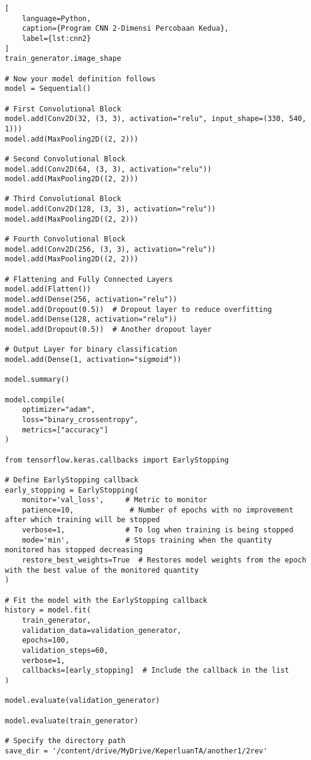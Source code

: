 \begin{lstlisting}[
    language=Python,
    caption={Program CNN 2-Dimensi Percobaan Kedua},
    label={lst:cnn2}
]
train_generator.image_shape

# Now your model definition follows
model = Sequential()

# First Convolutional Block
model.add(Conv2D(32, (3, 3), activation="relu", input_shape=(330, 540, 1)))
model.add(MaxPooling2D((2, 2)))

# Second Convolutional Block
model.add(Conv2D(64, (3, 3), activation="relu"))
model.add(MaxPooling2D((2, 2)))

# Third Convolutional Block
model.add(Conv2D(128, (3, 3), activation="relu"))
model.add(MaxPooling2D((2, 2)))

# Fourth Convolutional Block
model.add(Conv2D(256, (3, 3), activation="relu"))
model.add(MaxPooling2D((2, 2)))

# Flattening and Fully Connected Layers
model.add(Flatten())
model.add(Dense(256, activation="relu"))
model.add(Dropout(0.5))  # Dropout layer to reduce overfitting
model.add(Dense(128, activation="relu"))
model.add(Dropout(0.5))  # Another dropout layer

# Output Layer for binary classification
model.add(Dense(1, activation="sigmoid"))

model.summary()

model.compile(
    optimizer="adam",
    loss="binary_crossentropy",
    metrics=["accuracy"]
)

from tensorflow.keras.callbacks import EarlyStopping

# Define EarlyStopping callback
early_stopping = EarlyStopping(
    monitor='val_loss',     # Metric to monitor
    patience=10,             # Number of epochs with no improvement after which training will be stopped
    verbose=1,              # To log when training is being stopped
    mode='min',             # Stops training when the quantity monitored has stopped decreasing
    restore_best_weights=True  # Restores model weights from the epoch with the best value of the monitored quantity
)

# Fit the model with the EarlyStopping callback
history = model.fit(
    train_generator,
    validation_data=validation_generator,
    epochs=100,
    validation_steps=60,
    verbose=1,
    callbacks=[early_stopping]  # Include the callback in the list
)

model.evaluate(validation_generator)

model.evaluate(train_generator)

# Specify the directory path
save_dir = '/content/drive/MyDrive/KeperluanTA/another1/2rev'


\end{lstlisting}
